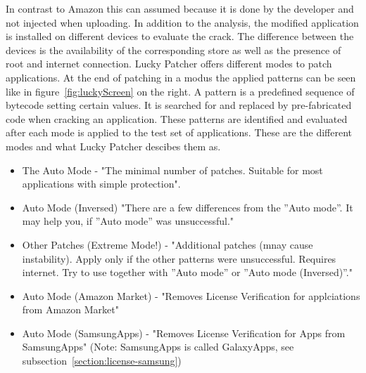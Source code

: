 In contrast to Amazon this can assumed because it is done by the developer and not injected when uploading.
\newline
In addition to the analysis, the modified application is installed on different devices to evaluate the crack.
The difference between the devices is the availability of the corresponding store as well as the presence of root and internet connection.
\newline
Lucky Patcher offers different modes to patch applications.
At the end of patching in a modus the applied patterns can be seen like in figure~\ref{fig:luckyScreen} on the right.
A pattern is a predefined sequence of bytecode setting certain values.
It is searched for and replaced by pre-fabricated code when cracking an application.
These patterns are identified and evaluated after each mode is applied to the test set of applications.
\newline
These are the different modes and what Lucky Patcher descibes them as.
\begin{itemize}
\item The Auto Mode - "The minimal number of patches. Suitable for most applications with simple protection".
\item Auto Mode (Inversed) "There are a few differences from the ”Auto mode”. It may help you, if ”Auto mode” was unsuccessful."
\item Other Patches (Extreme Mode!) - "Additional patches (mnay cause instability). Apply only if the other patterns were unsuccessful. Requires internet. Try to use together with ”Auto mode” or ”Auto mode (Inversed)”."
\item Auto Mode (Amazon Market) - "Removes License Verification for applciations from Amazon Market"
\item Auto Mode (SamsungApps) - "Removes License Verification for Apps from SamsungApps" (Note: SamsungApps is called GalaxyApps, see subsection~\ref{section:license-samsung})
\end{itemize}
